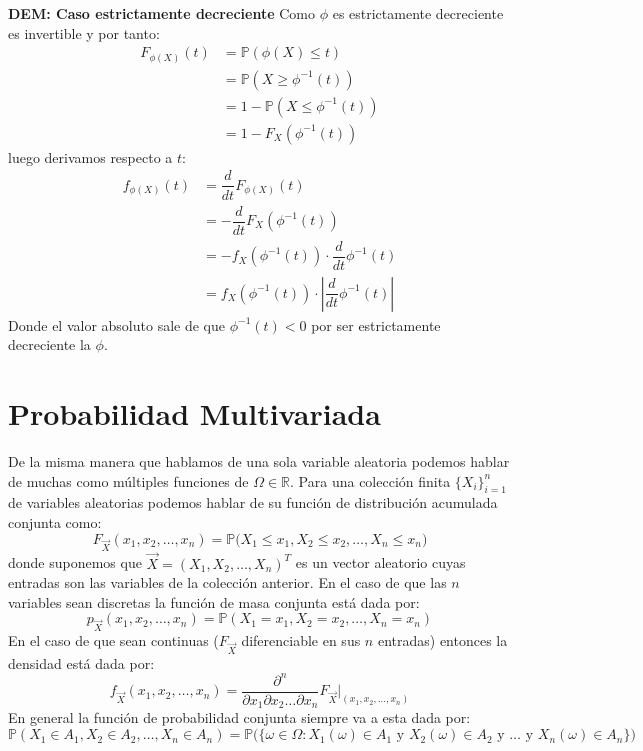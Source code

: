 \documentclass[
]{book}
\begin{document}
\textbf{DEM: Caso estrictamente decreciente}
Como \(\phi\) es estrictamente decreciente es invertible y por tanto:
\begin{equation}\nonumber
\begin{aligned}
F_{\phi(X)}(t) & =  \mathbb{P}(\phi(X) \leq t) \\
& = \mathbb{P}(X \geq \phi^{-1}(t) ) \\
& = 1 - \mathbb{P}(X \leq \phi^{-1}(t) ) \\
& = 1 - F_X( \phi^{-1}(t) )
\end{aligned}
\end{equation}
luego derivamos respecto a \(t\):
\begin{equation}\nonumber
\begin{aligned}
f_{\phi(X)}(t) & = \dfrac{d}{dt} F_{\phi(X)}(t) \\
& = - \dfrac{d}{dt} F_X( \phi^{-1}(t) )  \\
& = - f_X( \phi^{-1}(t) ) \cdot \dfrac{d}{dt} \phi^{-1}(t)  \\
& = f_X( \phi^{-1}(t) ) \cdot \left| \dfrac{d}{dt}  \phi^{-1}(t)  \right|
\end{aligned}
\end{equation}
Donde el valor absoluto sale de que \(\phi^{-1}(t) < 0\) por ser estrictamente decreciente la \(\phi\).

\hypertarget{probabilidad-multivariada}{%
\section{Probabilidad Multivariada}\label{probabilidad-multivariada}}

De la misma manera que hablamos de una sola variable aleatoria podemos hablar de muchas como múltiples funciones de \(\Omega \in \mathbb{R}\). Para una colección finita \(\{ X_i \}_{i = 1}^n\) de variables aleatorias podemos hablar de su función de distribución acumulada conjunta como:
\[
F_{\vec{X}}(x_1, x_2, \dots, x_n) = \mathbb{P}\big( X_1 \leq x_1, X_2 \leq x_2, \dots, X_n \leq x_n)
\]
donde suponemos que \(\vec{X} = (X_1, X_2, \dots, X_n)^T\) es un vector aleatorio cuyas entradas son las variables de la colección anterior. En el caso de que las \(n\) variables sean discretas la función de masa conjunta está dada por:
\[
p_{\vec{X}}(x_1, x_2, \dots, x_n) = \mathbb{P}(X_1 = x_1, X_2 = x_2, \dots, X_n = x_n)
\]
En el caso de que sean continuas (\(F_{\vec{X}}\) diferenciable en sus \(n\) entradas) entonces la densidad está dada por:
\[
f_{\vec{X}}(x_1, x_2, \dots, x_n) = \dfrac{\partial^n}{\partial x_1 \partial x_2 \dots \partial x_n}F_{\vec{X}}\Bigg|_{(x_1, x_2, \dots, x_n)}
\]
En general la función de probabilidad conjunta siempre va a esta dada por:
\[
\mathbb{P}(X_1 \in A_1, X_2 \in A_2, \dots, X_n \in A_n) = \mathbb{P}\Big(\{ \omega \in \Omega :  X_1(\omega) \in A_1 \text{ y } X_2(\omega) \in A_2  \text{ y } \dots \text{ y } X_n(\omega) \in A_n \}\Big)
\]
\end{document}
